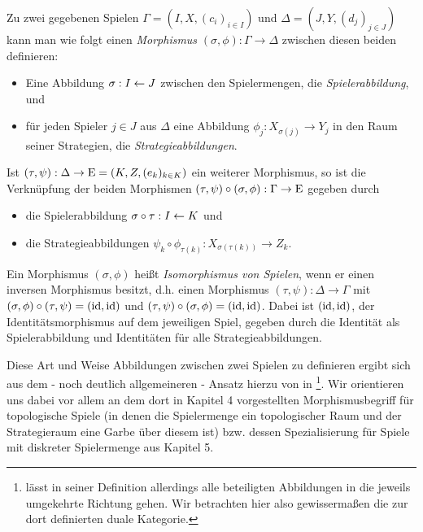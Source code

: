 \begin{defn}\label{defn:MorphismusVonSpielen}
	Zu zwei gegebenen Spielen $\Gamma = (I, X, (c_i)_{i\in I})$ und $\Delta = (J, Y, (d_j)_{j\in J})$ kann man wie folgt einen \emph{Morphismus} $(\sigma, \phi): \Gamma \to \Delta$ zwischen diesen beiden definieren:
	\begin{itemize}
		\item Eine Abbildung $\sigma: I \leftarrow J$ zwischen den Spielermengen, die \emph{Spielerabbildung}, und
		\item für jeden Spieler $j \in J$ aus $\Delta$ eine Abbildung $\phi_j: X_{\sigma(j)} \to Y_j$ in den Raum seiner Strategien, die \emph{Strategieabbildungen}.
	\end{itemize}
	Ist $(\tau, \psi): \Delta \to \mathrm{E} = (K, Z, (e_k)_{k \in K})$ ein weiterer Morphismus, so ist die Verknüpfung der beiden Morphismen $(\tau, \psi) \circ (\sigma, \phi): \Gamma \to \mathrm{E}$ gegeben durch
	\begin{itemize}
		\item die Spielerabbildung $\sigma\circ\tau: I \leftarrow K$ und
		\item die Strategieabbildungen $\psi_k \circ \phi_{\tau(k)}: X_{\sigma(\tau(k))} \to Z_k$.
	\end{itemize}
	Ein Morphismus $(\sigma, \phi)$ heißt \emph{Isomorphismus von Spielen}, wenn er einen inversen Morphismus besitzt, d.h. einen Morphismus $(\tau, \psi): \Delta \to \Gamma$ mit $(\sigma, \phi) \circ (\tau, \psi) = (\mathrm{id}, \mathrm{id})$ und $(\tau, \psi) \circ (\sigma, \phi) = (\mathrm{id}, \mathrm{id})$. Dabei ist $(\mathrm{id}, \mathrm{id})$, der Identitätsmorphismus auf dem jeweiligen Spiel, gegeben durch die Identität als Spielerabbildung und Identitäten für alle Strategieabbildungen.
\end{defn}

Diese Art und Weise Abbildungen zwischen zwei Spielen zu definieren ergibt sich aus dem - noch deutlich allgemeineren - Ansatz hierzu von \citeauthor{LapGameCat} in \cite{LapGameCat}\footnote{\citeauthor{LapGameCat} lässt in seiner Definition allerdings alle beteiligten Abbildungen in die jeweils umgekehrte Richtung gehen. Wir betrachten hier also gewissermaßen die zur dort definierten duale Kategorie.}. Wir orientieren uns dabei vor allem an dem dort in Kapitel 4 vorgestellten Morphismusbegriff für topologische Spiele (in denen die Spielermenge ein topologischer Raum und der Strategieraum eine Garbe über diesem ist) bzw. dessen Spezialisierung für Spiele mit diskreter Spielermenge aus Kapitel 5. 

